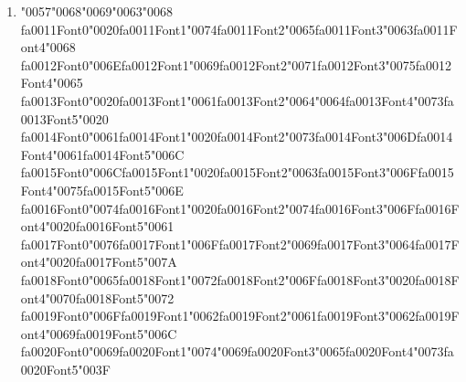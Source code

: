 \documentclass[12pt]{article}
\begin{document}
\begin{enumerate}[label=Q\arabic*.]
\begin{enumerate}[label=(\Alph*)]
    \item Generative models model $P(x,y)$, while discriminative models model $P(y \mid x)$
    \item Discriminative models learn the data distribution and use that knowledge for classification
    \item Discriminative models require no training data
    \item Generative models are less explainable
\end{enumerate}
\item {\char"0057}{\char"0068}{\char"0069}{\char"0063}{\char"0068} {\csname fa0011Font0\endcsname\char"0020}{\csname fa0011Font1\endcsname\char"0074}{\csname fa0011Font2\endcsname\char"0065}{\csname fa0011Font3\endcsname\char"0063}{\csname fa0011Font4\endcsname\char"0068} {\csname fa0012Font0\endcsname\char"006E}{\csname fa0012Font1\endcsname\char"0069}{\csname fa0012Font2\endcsname\char"0071}{\csname fa0012Font3\endcsname\char"0075}{\csname fa0012Font4\endcsname\char"0065} {\csname fa0013Font0\endcsname\char"0020}{\csname fa0013Font1\endcsname\char"0061}{\csname fa0013Font2\endcsname\char"0064}{\char"0064}{\csname fa0013Font4\endcsname\char"0073}{\csname fa0013Font5\endcsname\char"0020} {\csname fa0014Font0\endcsname\char"0061}{\csname fa0014Font1\endcsname\char"0020}{\csname fa0014Font2\endcsname\char"0073}{\csname fa0014Font3\endcsname\char"006D}{\csname fa0014Font4\endcsname\char"0061}{\csname fa0014Font5\endcsname\char"006C} {\csname fa0015Font0\endcsname\char"006C}{\csname fa0015Font1\endcsname\char"0020}{\csname fa0015Font2\endcsname\char"0063}{\csname fa0015Font3\endcsname\char"006F}{\csname fa0015Font4\endcsname\char"0075}{\csname fa0015Font5\endcsname\char"006E} {\csname fa0016Font0\endcsname\char"0074}{\csname fa0016Font1\endcsname\char"0020}{\csname fa0016Font2\endcsname\char"0074}{\csname fa0016Font3\endcsname\char"006F}{\csname fa0016Font4\endcsname\char"0020}{\csname fa0016Font5\endcsname\char"0061} {\csname fa0017Font0\endcsname\char"0076}{\csname fa0017Font1\endcsname\char"006F}{\csname fa0017Font2\endcsname\char"0069}{\csname fa0017Font3\endcsname\char"0064}{\csname fa0017Font4\endcsname\char"0020}{\csname fa0017Font5\endcsname\char"007A} {\csname fa0018Font0\endcsname\char"0065}{\csname fa0018Font1\endcsname\char"0072}{\csname fa0018Font2\endcsname\char"006F}{\csname fa0018Font3\endcsname\char"0020}{\csname fa0018Font4\endcsname\char"0070}{\csname fa0018Font5\endcsname\char"0072} {\csname fa0019Font0\endcsname\char"006F}{\csname fa0019Font1\endcsname\char"0062}{\csname fa0019Font2\endcsname\char"0061}{\csname fa0019Font3\endcsname\char"0062}{\csname fa0019Font4\endcsname\char"0069}{\csname fa0019Font5\endcsname\char"006C} {\csname fa0020Font0\endcsname\char"0069}{\csname fa0020Font1\endcsname\char"0074}{\char"0069}{\csname fa0020Font3\endcsname\char"0065}{\csname fa0020Font4\endcsname\char"0073}{\csname fa0020Font5\endcsname\char"003F}

\end{enumerate}
\end{document}
